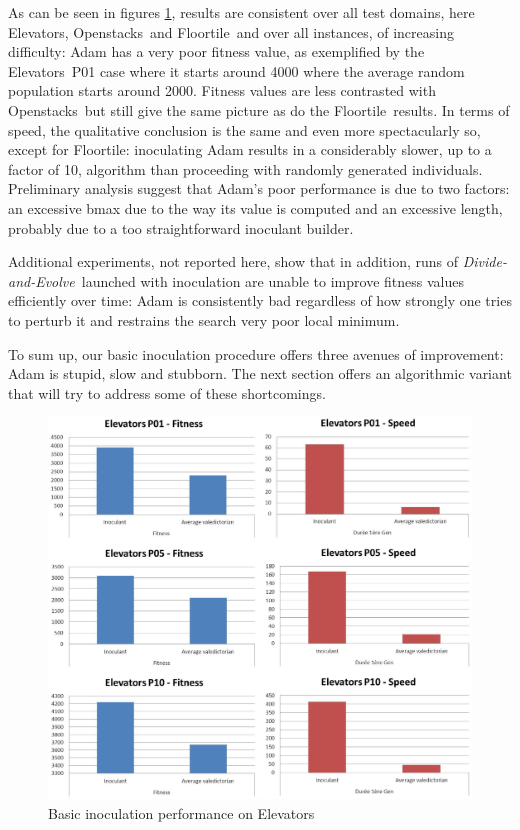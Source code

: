\documentclass[english]{DESCARWINreport}
\newcommand{\dae}{{\em Divide-and-Evolve}}
\newcommand{\OPENSTACKS}{{\sc Openstacks}}
\newcommand{\ELEVATORS}{{\sc Elevators}}
\newcommand{\FLOORTILE}{{\sc Floortile}}
\begin{document}
As can be seen in figures \ref{fig:adam_el}, results are consistent over all test domains, here \ELEVATORS, \OPENSTACKS\ and \FLOORTILE\ and over all instances, of increasing difficulty: Adam has a very poor fitness value, as exemplified by the \ELEVATORS\ P01 case where it starts around 4000 where the average random population starts around 2000. Fitness values are less contrasted with \OPENSTACKS\ but still give the same picture as do the \FLOORTILE\ results. In terms of speed, the qualitative conclusion is the same and even more spectacularly so, except for \FLOORTILE: inoculating Adam results in a considerably slower, up to a factor of 10, algorithm than proceeding with randomly generated individuals. Preliminary analysis suggest that Adam's poor performance is due to two factors: an excessive bmax due to the way its value is computed and an excessive length, probably due to a too straightforward inoculant builder.

Additional experiments, not reported here, show that in addition, runs of \dae\ launched with inoculation are unable to improve fitness values efficiently over time: Adam is consistently bad regardless of how strongly one tries to perturb it and restrains the search very poor local minimum.

To sum up, our basic inoculation procedure offers three avenues of improvement: Adam is stupid, slow and stubborn. The next section offers an algorithmic variant that will try to address some of these shortcomings.

\begin{figure}
	\centering
		\includegraphics[width=\textwidth]{pics/Elevators.eps}
	\caption{Basic inoculation performance on \ELEVATORS}
	\label{fig:adam_el}
\end{figure}
\end{document}
